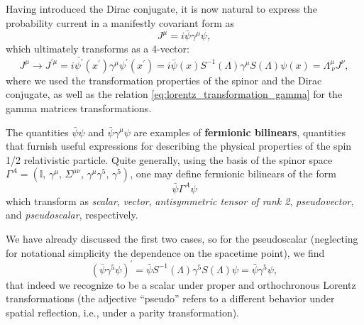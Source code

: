 Having introduced the Dirac conjugate, it is now natural to express the probability current in a manifestly covariant form as
\begin{equation}
    J^{\mu} = i \bar{\psi} \gamma^{\mu} \psi,
    \label{eq:dirac_current_covariant}
\end{equation}
which ultimately transforms as a 4-vector:
\[
    J^{\mu} \to J^{\prime \mu} = i \bar{\psi^{\prime}}(x^{\prime}) \gamma^{\mu} \psi^{\prime}(x^{\prime}) = i \bar{\psi}(x) S^{-1}(\Lambda) \gamma^{\mu} S(\Lambda) \psi(x) = \Lambda^{\mu}_{\ \nu} J^{\nu},
\]
where we used the transformation properties of the spinor and the Dirac conjugate, as well as the relation \eqref{eq:lorentz_transformation_gamma} for the gamma matrices transformations.

The quantities \(\bar{\psi}\psi\) and \(\bar{\psi} \gamma^{\mu} \psi\) are examples of \textbf{fermionic bilinears}, quantities that furnish useful expressions for describing the physical properties of the spin 1/2 relativistic particle. Quite generally, using the basis of the spinor space \(\Gamma^A = (\mathbb{I},\,\gamma^{\mu},\, \Sigma^{\mu \nu},\, \gamma^{\mu} \gamma^5,\, \gamma^5)\), one may define fermionic bilinears of the form
\[
    \bar{\psi} \Gamma^A \psi
\]
which transform as \textit{scalar}, \textit{vector}, \textit{antisymmetric tensor of rank 2}, \textit{pseudovector}, and \textit{pseudoscalar}, respectively.

We have already discussed the first two cases, so for the pseudoscalar (neglecting for notational simplicity the dependence on the spacetime point), we find
\[
    (\overline{\psi} \gamma^5 \psi)^{\prime} = \bar{\psi} S^{-1}(\Lambda) \gamma^5 S(\Lambda) \psi = \bar{\psi} \gamma^5 \psi,
\]
that indeed we recognize to be a scalar under proper and orthochronous Lorentz transformations (the adjective “pseudo” refers to a different behavior under spatial reflection, i.e., under a parity transformation).

